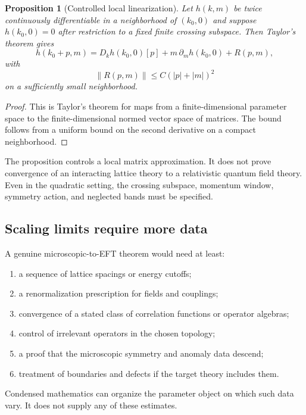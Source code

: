\documentclass[12pt]{article}
\newtheorem{proposition}[theorem]{Proposition}
\theoremstyle{definition}
\theoremstyle{remark}
\begin{document}
\begin{proposition}[Controlled local linearization]
\label{prop:linearization}
Let $h(k,m)$ be twice continuously differentiable in a neighborhood of
$(k_0,0)$ and suppose $h(k_0,0)=0$ after restriction to a fixed finite
crossing subspace.
Then Taylor's theorem gives
\[
h(k_0+p,m)
=
D_kh(k_0,0)[p]
+m\,\partial_mh(k_0,0)
+R(p,m),
\]
with
\[
\|R(p,m)\|
\leq C(|p|+|m|)^2
\]
on a sufficiently small neighborhood.
\end{proposition}

\begin{proof}
This is Taylor's theorem for maps from a finite-dimensional parameter space
to the finite-dimensional normed vector space of matrices.
The bound follows from a uniform bound on the second derivative on a compact
neighborhood.
\end{proof}

The proposition controls a local matrix approximation.
It does not prove convergence of an interacting lattice theory to a
relativistic quantum field theory.
Even in the quadratic setting, the crossing subspace, momentum window,
symmetry action, and neglected bands must be specified.

\subsection{Scaling limits require more data}

A genuine microscopic-to-EFT theorem would need at least:

\begin{enumerate}[label=(\alph*)]
  \item a sequence of lattice spacings or energy cutoffs;
  \item a renormalization prescription for fields and couplings;
  \item convergence of a stated class of correlation functions or operator
  algebras;
  \item control of irrelevant operators in the chosen topology;
  \item a proof that the microscopic symmetry and anomaly data descend;
  \item treatment of boundaries and defects if the target theory includes
  them.
\end{enumerate}

Condensed mathematics can organize the parameter object on which such data
vary.
It does not supply any of these estimates.
\end{document}
